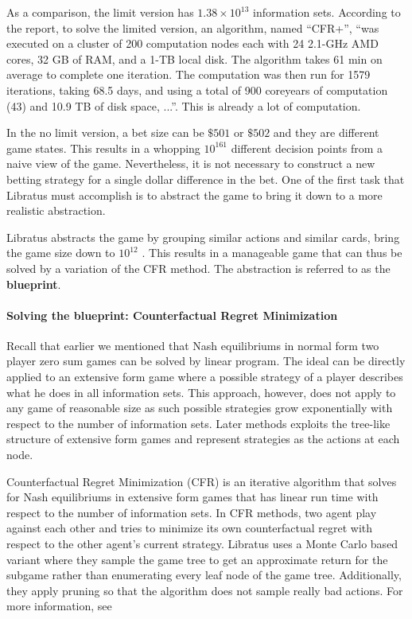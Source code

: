 \documentclass[10pt,a4paper]{article}
\begin{document}
As a comparison, the limit version has $1.38 \times 10^{13}$ information sets. According to the report, to solve the limited version, an algorithm, named ``CFR+'', ``was executed on a cluster of 200 computation nodes each with 24 2.1-GHz AMD cores, 32 GB of RAM, and a 1-TB local disk. The algorithm takes 61 min on average to complete one iteration. The computation was then run for 1579 iterations, taking 68.5 days, and using a total of 900 coreyears of computation (43) and 10.9 TB of disk space, ...''. This is already a lot of computation. 

In the no limit version, a bet size can be $\$ 501$ or $\$ 502$ and they are different game states. This results in a whopping $10^161$ different decision points from a naive view of the game. Nevertheless, it is not necessary to construct a new betting strategy for a single dollar difference  in the bet. One of the first task that Libratus must accomplish is to abstract the game to bring it down to a more realistic abstraction. 

Libratus abstracts the game by grouping similar actions and similar cards, bring the game size down to $10^{12}$ \cite{brown2017superhuman}. This results in a manageable game that can thus be solved by a variation of the CFR method. The abstraction is referred to as the \textbf{blueprint}. 

\paragraph{Solving the blueprint: Counterfactual Regret Minimization}
Recall that earlier we mentioned that Nash equilibriums in normal form two player zero sum games can be solved by linear program. The ideal can be directly applied to an extensive form game where a possible strategy of a player describes what he does in all information sets. This approach, however, does not apply to any game of reasonable size as such possible strategies grow exponentially with respect to the number of information sets. Later methods exploits the tree-like structure of extensive form games and represent strategies as the actions at each node. 

Counterfactual Regret Minimization (CFR) is an iterative algorithm that solves for Nash equilibriums in extensive form games that has linear run time with respect to the number of information sets. In CFR methods, two agent play against each other and tries to minimize its own counterfactual regret with respect to the other agent's current strategy. Libratus uses a Monte Carlo based variant where they sample the game tree to get an approximate return for the subgame rather than enumerating every leaf node of the game tree. Additionally, they apply pruning so that the algorithm does not sample really bad actions. For more information, see~\cite{zinkevich2008regret, johanson2012efficient}
\end{document}
